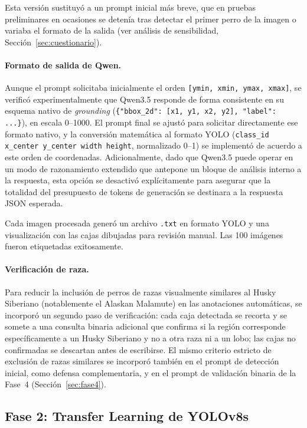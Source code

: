 \documentclass[11pt]{article}
\begin{document}
Esta versión sustituyó a un prompt inicial más breve, que en pruebas preliminares en ocasiones
se detenía tras detectar el primer perro de la imagen o variaba el formato de la salida (ver
análisis de sensibilidad, Sección~\ref{sec:cuestionario}).

\paragraph{Formato de salida de Qwen.} Aunque el prompt solicitaba inicialmente el orden
\texttt{[ymin, xmin, ymax, xmax]}, se verificó experimentalmente que Qwen3.5 responde de forma
consistente en su esquema nativo de \textit{grounding}
(\texttt{\{"bbox\_2d": [x1, y1, x2, y2], "label": ...\}}), en escala 0--1000. El prompt final se
ajustó para solicitar directamente ese formato nativo, y la conversión matemática al formato
YOLO (\texttt{class\_id x\_center y\_center width height}, normalizado 0--1) se implementó de
acuerdo a este orden de coordenadas. Adicionalmente, dado que Qwen3.5 puede operar en un modo
de razonamiento extendido que antepone un bloque de análisis interno a la respuesta, esta opción
se desactivó explícitamente para asegurar que la totalidad del presupuesto de tokens de
generación se destinara a la respuesta JSON esperada.

Cada imagen procesada generó un archivo \texttt{.txt} en formato YOLO y una visualización con
las cajas dibujadas para revisión manual. Las 100 imágenes fueron etiquetadas exitosamente.

\paragraph{Verificación de raza.} Para reducir la inclusión de perros de razas visualmente
similares al Husky Siberiano (notablemente el Alaskan Malamute) en las anotaciones automáticas,
se incorporó un segundo paso de verificación: cada caja detectada se recorta y se somete a una
consulta binaria adicional que confirma si la región corresponde específicamente a un Husky
Siberiano y no a otra raza ni a un lobo; las cajas no confirmadas se descartan antes de
escribirse. El mismo criterio estricto de exclusión de razas similares se incorporó también en
el prompt de detección inicial, como defensa complementaria, y en el prompt de validación
binaria de la Fase~4 (Sección~\ref{sec:fase4}).

\subsection{Fase 2: Transfer Learning de YOLOv8s}
\label{sec:fase2}
\end{document}
